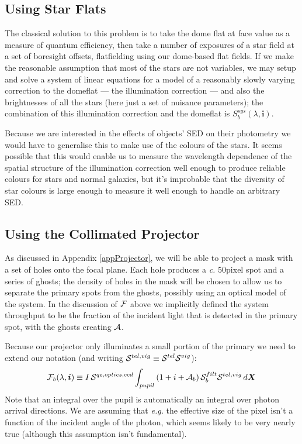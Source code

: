 \documentclass[12pt]{article}
\renewcommand{\c}{\textit{c.}\xspace}
\newcommand{\eg}{\textit{e.g.}\xspace}
\newcommand{\ib}{{\boldsymbol i}}
\newcommand{\Xb}{{\boldsymbol X}}
\newcommand{\Flat}{{\cal F}}
\newcommand{\additive}{{\cal A}}
\newcommand{\qe}{{\cal S}}
\begin{document}
\subsection{Using Star Flats}
\label{secStarFlats}

The classical solution to this problem is to take the dome flat at face value as a measure of quantum
efficiency, then take a number of exposures of a star field at a set of boresight offsets, flatfielding using
our dome-based flat fields.  If we make the reasonable assumption that most of the stars are not variables, we
may setup and solve a system of linear equations for a model of a reasonably slowly varying correction to the
domeflat --- the illumination correction --- and also the brightnesses of all the stars (here just a set of
nuisance parameters); the combination of this illumination correction and the domeflat is $S_b^{sys}(\lambda, \ib)$.

Because we are interested in the effects of objects' SED on their photometry we would have to generalise this
to make use of the colours of the stars.  It seems possible that this would enable us to measure the
wavelength dependence of the spatial structure of the illumination correction well enough to produce reliable
colours for stars and normal galaxies, but it's improbable that the diversity of star colours is large enough
to measure it well enough to handle an arbitrary SED.

\subsection{Using the Collimated Projector}
\label{secProjector}

As discussed in Appendix \ref{appProjector}, we will be able to project a mask with a set of holes onto the
focal plane.  Each hole produces a \c 50pixel spot and a series of ghosts;  the density of holes in the
mask will be chosen to allow us to separate the primary spots from the ghosts, possibly using an optical model
of the system.  In the discussion of $\Flat$ above we implicitly defined the system throughput to be the
fraction of the incident light that is detected in the primary spot, with the ghosts creating $\additive$.

Because our projector only illuminates a small portion of the primary we need to extend
our notation (and writing $\qe^{tel, vig} \equiv \qe^{tel} \qe^{vig}$):
$$
\Flat_b(\lambda, \ib) \equiv I\, \qe^{qe, optics, ccd} \int_{pupil} \left(
                                                                1 + i + \additive_b
                                              \right) \qe_b^{filt} \qe^{tel, vig}\, d\Xb
$$
Note that an integral over the pupil is automatically an integral over photon arrival directions.  We
are assuming that \eg the effective size of the pixel isn't a function of the incident angle of the photon,
which seems likely to be very nearly true (although this assumption isn't fundamental).
\end{document}
